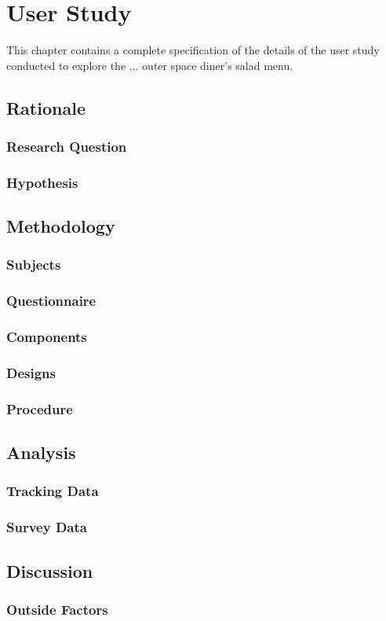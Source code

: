 \chapter{User Study}

This chapter contains a complete specification of the details of the user study conducted to explore the ... outer space diner's salad menu.

\section{Rationale}

\subsection{Research Question}

\subsection{Hypothesis}

\section{Methodology}

\subsection{Subjects}

\subsection{Questionnaire}

\subsection{Components}

\subsection{Designs}

\subsection{Procedure}

\section{Analysis}

\subsection{Tracking Data}

\subsection{Survey Data}

\section{Discussion}

\subsection{Outside Factors}

